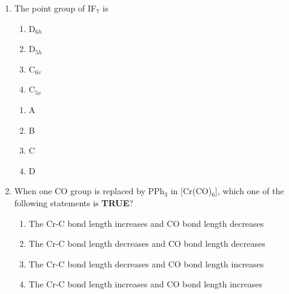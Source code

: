 \documentclass[journal,12pt,onecolumn]{exam}
\theoremstyle{remark}
\newcommand{\correct}{\textcolor{correctgreen}{\checkmark}}
\newcommand{\wrong}{\textcolor{wrongred}{\ding{55}}} %
\begin{document}
\begin{enumerate}
\begin{enumerate}
    \item both paramagnetic
    \item both diamagnetic
    \item paramagnetic and diamagnetic, respectively
    \item diamagnetic and paramagnetic, respectively
\end{enumerate}

\hfill{}

\begin{multicols}{2}
\begin{enumerate}[leftmargin=*, align=left]
    \item \wrong A
    \item \wrong B
    \item \wrong C
    \item \correct D
\end{enumerate}
\end{multicols}


\item
The point group of IF$_7$ is

\begin{enumerate}
    \item D$_{6h}$
    \item D$_{5h}$
    \item C$_{6v}$
    \item C$_{5v}$
\end{enumerate}

\hfill{}

\begin{multicols}{2}
\begin{enumerate}[leftmargin=*, align=left]
    \item \wrong A
    \item \correct B
    \item \wrong C
    \item \wrong D
\end{enumerate}
\end{multicols}






\item
When one CO group is replaced by PPh$_3$ in [Cr(CO)$_6$], which one of the following statements is \textbf{TRUE}?

\begin{enumerate}
    \item The Cr-C bond length increases and CO bond length decreases
    \item The Cr-C bond length decreases and CO bond length decreases
    \item The Cr-C bond length decreases and CO bond length increases
    \item The Cr-C bond length increases and CO bond length increases
\end{enumerate}


\end{enumerate}
\end{document}

